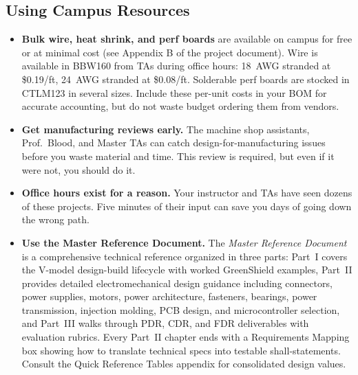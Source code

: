 \subsection{Using Campus Resources}

\begin{itemize}[leftmargin=*, itemsep=4pt]
    \item \textbf{Bulk wire, heat shrink, and perf boards} are available on campus for free or at minimal cost (see Appendix B of the project document). Wire is available in BBW160 from TAs during office hours: 18~AWG stranded at \$0.19/ft, 24~AWG stranded at \$0.08/ft. Solderable perf boards are stocked in CTLM123 in several sizes. Include these per-unit costs in your BOM for accurate accounting, but do not waste budget ordering them from vendors.
    \item \textbf{Get manufacturing reviews early.} The machine shop assistants, Prof.\ Blood, and Master TAs can catch design-for-manufacturing issues before you waste material and time. This review is required, but even if it were not, you should do it.
    \item \textbf{Office hours exist for a reason.} Your instructor and TAs have seen dozens of these projects. Five minutes of their input can save you days of going down the wrong path.
    \item \textbf{Use the Master Reference Document.} The \textit{Master Reference Document} is a comprehensive technical reference organized in three parts: Part~I covers the V-model design-build lifecycle with worked GreenShield examples, Part~II provides detailed electromechanical design guidance including connectors, power supplies, motors, power architecture, fasteners, bearings, power transmission, injection molding, PCB design, and microcontroller selection, and Part~III walks through PDR, CDR, and FDR deliverables with evaluation rubrics. Every Part~II chapter ends with a Requirements Mapping box showing how to translate technical specs into testable shall-statements. Consult the Quick Reference Tables appendix for consolidated design values.
\end{itemize}

